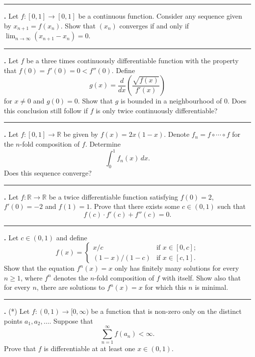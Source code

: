 \documentclass[11pt]{article}
\newcounter{probnum}
\newenvironment{problembox}{\par\noindent\rule{\linewidth}{0.5pt}\vspace{5pt}\par}{\vspace{2pt}}
\begin{document}
\begin{problembox}
\textbf{\theprobnum.} Let $f : [0,1] \to [0,1]$ be a continuous function. Consider any sequence given by $x_{n+1} = f(x_n)$. Show that $(x_n)$ converges if and only if $\lim_{n \to \infty} (x_{n+1} - x_n) = 0$.
\end{problembox}

\begin{problembox}
\textbf{\theprobnum.} Let $f$ be a three times continuously differentiable function with the property that $f(0) = f'(0) = 0 < f''(0)$. Define
\[
g(x) = \frac{d}{dx} \left( \frac{\sqrt{f(x)}}{f'(x)} \right)
\]
for $x \ne 0$ and $g(0) = 0$. Show that $g$ is bounded in a neighbourhood of $0$. Does this conclusion still follow if $f$ is only twice continuously differentiable?
\end{problembox}

\begin{problembox}
\textbf{\theprobnum.} Let $f : [0,1] \to \mathbb{R}$ be given by $f(x) = 2x(1-x)$. Denote $f_n = f \circ \cdots \circ f$ for the $n$-fold composition of $f$. Determine
\[
\int_0^1 f_n(x)\,dx.
\]
Does this sequence converge?
\end{problembox}

\begin{problembox}
\textbf{\theprobnum.} Let $f : \mathbb{R} \to \mathbb{R}$ be a twice differentiable function satisfying $f(0) = 2$, $f'(0) = -2$ and $f(1) = 1$. Prove that there exists some $c \in (0,1)$ such that
\[
f(c) \cdot f'(c) + f''(c) = 0.
\]
\end{problembox}

\begin{problembox}
\textbf{\theprobnum.} Let $c \in (0,1)$ and define
\[
f(x) =
\begin{cases}
x/c & \text{if } x \in [0,c]; \\
(1-x)/(1-c) & \text{if } x \in [c,1].
\end{cases}
\]
Show that the equation $f^n(x) = x$ only has finitely many solutions for every $n \ge 1$, where $f^n$ denotes the $n$-fold composition of $f$ with itself. Show also that for every $n$, there are solutions to $f^n(x) = x$ for which this $n$ is minimal.
\end{problembox}

\begin{problembox}
\textbf{\theprobnum.} (*) Let $f : (0,1) \to [0,\infty)$ be a function that is non-zero only on the distinct points $a_1, a_2, \ldots$. Suppose that
\[
\sum_{n=1}^{\infty} f(a_n) < \infty.
\]
Prove that $f$ is differentiable at at least one $x \in (0,1)$.
\end{problembox}
\end{document}

